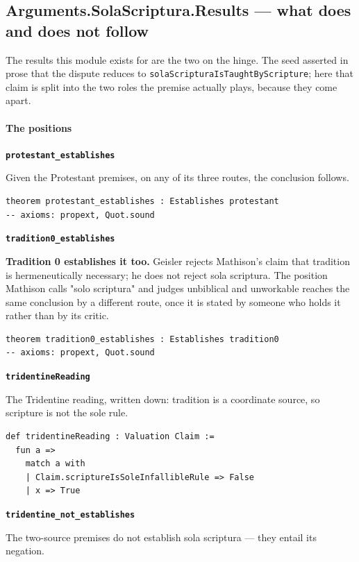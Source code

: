 \documentclass[11pt]{article}
\begin{document}
\subsection*{Arguments.SolaScriptura.Results — what does and does not follow}
The results this module exists for are the two on the hinge. The seed asserted in prose that the dispute reduces to \texttt{sola\allowbreak{}Scriptura\allowbreak{}Is\allowbreak{}Taught\allowbreak{}By\allowbreak{}Scripture}; here that claim is split into the two roles the premise actually plays, because they come apart.

\paragraph*{The positions}
\leavevmode\par
\par\medskip\noindent\textbf{\texttt{protestant\_\allowbreak{}establishes}}\par\nobreak\noindent
Given the Protestant premises, on any of its three routes, the conclusion follows.

{\small\begin{verbatim}
theorem protestant_establishes : Establishes protestant
-- axioms: propext, Quot.sound
\end{verbatim}}
\par\medskip\noindent\textbf{\texttt{tradition0\_\allowbreak{}establishes}}\par\nobreak\noindent
\textbf{Tradition 0 establishes it too.} Geisler rejects Mathison's claim that tradition is hermeneutically necessary; he does not reject sola scriptura. The position Mathison calls "solo scriptura" and judges unbiblical and unworkable reaches the same conclusion by a different route, once it is stated by someone who holds it rather than by its critic.

{\small\begin{verbatim}
theorem tradition0_establishes : Establishes tradition0
-- axioms: propext, Quot.sound
\end{verbatim}}
\par\medskip\noindent\textbf{\texttt{tridentine\allowbreak{}Reading}}\par\nobreak\noindent
The Tridentine reading, written down: tradition is a coordinate source, so scripture is not the sole rule.

{\small\begin{verbatim}
def tridentineReading : Valuation Claim :=
  fun a =>
    match a with
    | Claim.scriptureIsSoleInfallibleRule => False
    | x => True
\end{verbatim}}
\par\medskip\noindent\textbf{\texttt{tridentine\_\allowbreak{}not\_\allowbreak{}establishes}}\par\nobreak\noindent
The two-source premises do not establish sola scriptura — they entail its negation.
\end{document}

